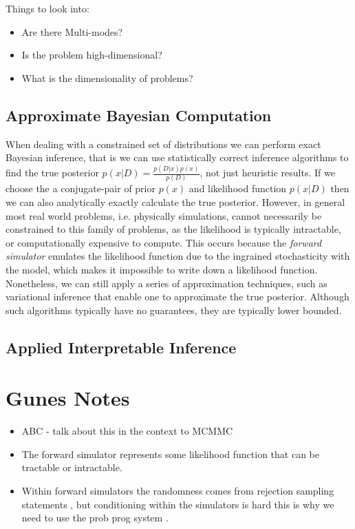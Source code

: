 \documentclass[]{scrartcl}
\begin{document}
Things to look into:

\begin{itemize}
\item Are there Multi-modes?
\item Is the problem high-dimensional?
\item What is the dimensionality of problems?
\end{itemize}


\subsection{Approximate Bayesian Computation}

When dealing with a constrained set of distributions we can perform exact Bayesian inference, that is we can use statistically correct inference algorithms to find the true posterior $p(x | D) = \frac{p(D|x)p(x)}{p(D)}$, not just heuristic results. If we choose the a conjugate-pair of prior $p(x)$ and likelihood function $p(x|D)$ then we can also analytically exactly calculate the true posterior. However, in general most real world problems, i.e. physically simulations, cannot necessarily be constrained to this family of problems, as the likelihood is typically intractable, or computationally expensive to compute. This occurs because the \textit{forward simulator} emulates the likelihood function
due to the ingrained stochasticity with the model, which makes it impossible to write down a likelihood function. Nonetheless, we can still apply a series of approximation techniques, such as variational inference that enable one to approximate the true posterior. Although such algorithms typically have no guarantees, they are typically lower bounded.   

\subsection{Applied Interpretable Inference}


\section{Gunes Notes}
\begin{itemize}
	\item ABC - talk about this in the context to MCMMC
	\item The forward simulator represents some likelihood function that can be tractable or intractable. 
	\item Within forward simulators the randomness comes from rejection sampling statements , but conditioning within the simulators is hard
this is why we need to use the prob prog system . 
\end{itemize}
\end{document}
